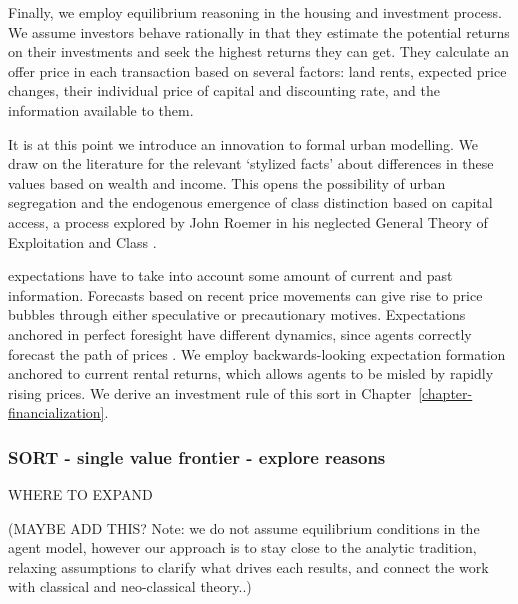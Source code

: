 Finally, we employ \gls{equilibrium reasoning} in the housing and investment process. We assume investors behave rationally in that they estimate the potential returns on their investments and seek the highest returns they can get. They calculate an offer price in each transaction based on several factors: land rents, expected price changes, their individual price of capital and discounting rate, and the information available to them.

It is at this point we introduce an innovation to formal urban modelling. We draw on the literature for the relevant `\gls{stylized facts}' about differences in these values based on wealth and income. This opens the possibility of urban segregation and the endogenous emergence of \gls{class} distinction based on capital access, a process explored by John Roemer in his neglected General Theory of Exploitation and Class \cite{roemerGeneralTheoryExploitation1982}.  

\Gls{expectations} have to take into account some amount of current and past information. Forecasts based on recent price movements can give rise to \gls{price bubble}s through either speculative or precautionary motives. Expectations anchored in \gls{perfect foresight} have different dynamics, since agents correctly forecast the path of prices \cite{muthRationalExpectationsTheory1961}. We employ backwards-looking expectation formation anchored 
to current rental returns, which allows agents to be misled by rapidly rising prices. We derive an investment rule of this sort in Chapter~\ref{chapter-financialization}. 

\subsubsection{SORT - single value frontier - explore reasons}
WHERE TO EXPAND%

(MAYBE ADD THIS? Note: we do not assume equilibrium conditions in the agent model, however our approach is to stay close to the analytic tradition, relaxing assumptions to clarify what drives each results, and connect the work with classical and neo-classical theory..)

